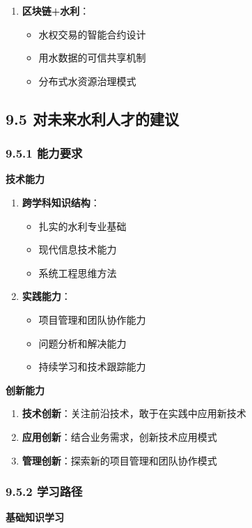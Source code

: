 \begin{enumerate}
\item \textbf{区块链+水利}： \begin{itemize} \tightlist \item 水权交易的智能合约设计 \item 用水数据的可信共享机制 \item 分布式水资源治理模式 \end{itemize}
\end{enumerate} \subsection{9.5 对未来水利人才的建议}\label{ux5bf9ux672aux6765ux6c34ux5229ux4ebaux624dux7684ux5efaux8bae}
\subsubsection{9.5.1 能力要求}\label{ux80fdux529bux8981ux6c42} \textbf{技术能力} \begin{enumerate}
\def\labelenumi{\arabic{enumi}.} \tightlist \item \textbf{跨学科知识结构}： \begin{itemize} \tightlist \item 扎实的水利专业基础 \item
现代信息技术能力 \item 系统工程思维方法 \end{itemize} \item \textbf{实践能力}： \begin{itemize} \tightlist \item 项目管理和团队协作能力 \item 问题分析和解决能力
\item 持续学习和技术跟踪能力 \end{itemize} \end{enumerate} \textbf{创新能力} \begin{enumerate} \def\labelenumi{\arabic{enumi}.}
\tightlist \item \textbf{技术创新}：关注前沿技术，敢于在实践中应用新技术 \item \textbf{应用创新}：结合业务需求，创新技术应用模式 \item
\textbf{管理创新}：探索新的项目管理和团队协作模式 \end{enumerate} \subsubsection{9.5.2 学习路径}\label{ux5b66ux4e60ux8defux5f84} \textbf{基础知识学习}
